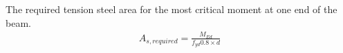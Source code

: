 The required tension steel area for the most critical moment at one end of the beam.
\begin{align*}
  A_{s,required} = \frac{M_{Ed}}{f_{yd} 0.8 \times d}
\end{align*}